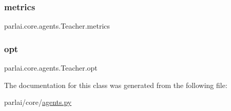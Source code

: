 \subsubsection{\texorpdfstring{metrics}{metrics}}
{\footnotesize\ttfamily parlai.\+core.\+agents.\+Teacher.\+metrics}

\mbox{\label{classparlai_1_1core_1_1agents_1_1Teacher_a3ce6243860ce978a897922863ed32fa4}} 
\subsubsection{\texorpdfstring{opt}{opt}}
{\footnotesize\ttfamily parlai.\+core.\+agents.\+Teacher.\+opt}



The documentation for this class was generated from the following file\+:\begin{DoxyCompactItemize}
\item 
parlai/core/\hyperlink{parlai_2core_2agents_8py}{agents.\+py}\end{DoxyCompactItemize}
